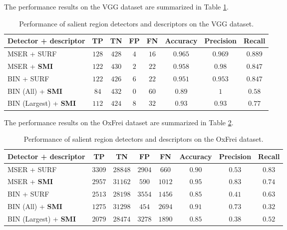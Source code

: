\documentclass[a4paper,11pt]{article}
\begin{document}

The performance results on the VGG dataset are summarized in Table \ref{tab:vgg}.
\begin{table}[!ht]
\begin{center}
\begin{tabular}{|l||c|c|c|c|c|c|c|}

\hline
Detector + descriptor & TP & TN & FP & FN & Accuracy &Precision &Recall\\
\hline
\hline
MSER + SURF & $128$ & $428$ &$4$ & $16$ & $0.965$ & $0.969$ & $0.889$\\
\hline
MSER + \bf{SMI} & $122$ &$430$  &$2$  &$22$  &$0.958$  & $0.98$ & $0.847$\\
\hline
BIN + SURF & $122$ & $426$ & $6$ & $22$ & $0.951$ & $0.953$ &$0.847$\\
\hline
BIN (All) + \bf{SMI} &$84$  &$432$  &$0$  &$60$ &$0.89$  & $1$ &$0.58$ \\
\hline
BIN (Largest) + \bf{SMI} &$112$  &$424$  &$8$  &$32$ &$0.93$  & $0.93$ &$0.77$ \\
\hline
\end{tabular}
\end{center}
\vspace{-20pt}
\caption{Performance of salient region detectors and descriptors on the VGG dataset.} \label{tab:vgg}
  \vspace{-10pt}
\end{table}


The performance results on the OxFrei dataset are summarized in Table \ref{tab:oxfrei}.
\begin{table}[!ht]
\begin{center}
\begin{tabular}{|l||c|c|c|c|c|c|c|}

\hline
Detector + descriptor & TP & TN & FP & FN & Accuracy &Precision &Recall\\
\hline
\hline
MSER + SURF & $3309$ & $28848$ & $2904$ & $660$ & $0.90$ & $0.53$ & $0.83$\\
\hline
MSER + \bf{SMI} & $2957$ & $31162$ & $590$ & $1012$ & $0.95$ &$0.83$ & $0.74$\\
\hline
BIN + SURF & $2513$ & $28198$ & $3554$ & $1456$ & $0.85$ &$0.41$ & $0.63$\\
\hline
BIN (All) + \bf{SMI}  & $1275$ & $31298$ & $454$ & $2694$ & $0.91$ &$0.73$ & $0.32$\\
\hline
BIN (Largest) + \bf{SMI}  & $2079$& $28474$ & $3278$ & $1890$ & $0.85$ & $0.38$ & $0.52$\\
\hline
\end{tabular}
\end{center}
\vspace{-20pt}
\caption{Performance of salient region detectors and descriptors on the OxFrei dataset.} \label{tab:oxfrei}
  \vspace{-10pt}
\end{table}
\end{document}
